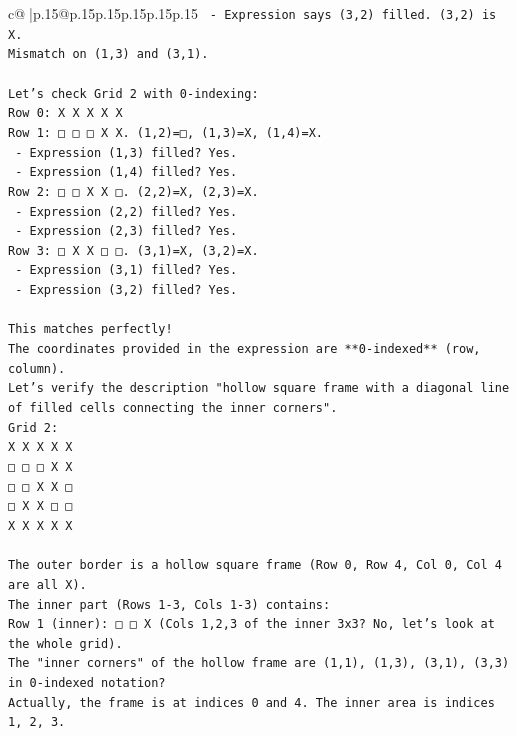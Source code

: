 \documentclass{article}
\begin{document}
{\begin{supertabular}{c@{$\;$}|p{.15\linewidth}@{}p{.15\linewidth}p{.15\linewidth}p{.15\linewidth}p{.15\linewidth}p{.15\linewidth}}
{{{\texttt{   {-} Expression says (3,2) filled. (3,2) is X.} \\
\texttt{Mismatch on (1,3) and (3,1).} \\
\\ 
\texttt{Let's check Grid 2 with 0{-}indexing:} \\
\texttt{Row 0: X X X X X} \\
\texttt{Row 1: □ □ □ X X. (1,2)=□, (1,3)=X, (1,4)=X.} \\
\texttt{   {-} Expression (1,3) filled? Yes.} \\
\texttt{   {-} Expression (1,4) filled? Yes.} \\
\texttt{Row 2: □ □ X X □. (2,2)=X, (2,3)=X.} \\
\texttt{   {-} Expression (2,2) filled? Yes.} \\
\texttt{   {-} Expression (2,3) filled? Yes.} \\
\texttt{Row 3: □ X X □ □. (3,1)=X, (3,2)=X.} \\
\texttt{   {-} Expression (3,1) filled? Yes.} \\
\texttt{   {-} Expression (3,2) filled? Yes.} \\
\\ 
\texttt{This matches perfectly!} \\
\texttt{The coordinates provided in the expression are **0{-}indexed** (row, column).} \\
\texttt{Let's verify the description "hollow square frame with a diagonal line of filled cells connecting the inner corners".} \\
\texttt{Grid 2:} \\
\texttt{X X X X X} \\
\texttt{□ □ □ X X} \\
\texttt{□ □ X X □} \\
\texttt{□ X X □ □} \\
\texttt{X X X X X} \\
\\ 
\texttt{The outer border is a hollow square frame (Row 0, Row 4, Col 0, Col 4 are all X).} \\
\texttt{The inner part (Rows 1{-}3, Cols 1{-}3) contains:} \\
\texttt{Row 1 (inner): □ □ X (Cols 1,2,3 of the inner 3x3? No, let's look at the whole grid).} \\
\texttt{The "inner corners" of the hollow frame are (1,1), (1,3), (3,1), (3,3) in 0{-}indexed notation?} \\
\texttt{Actually, the frame is at indices 0 and 4. The inner area is indices 1, 2, 3.} \\
}}}
\end{supertabular}}
\end{document}
